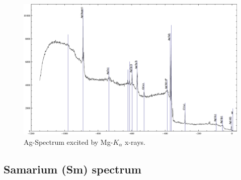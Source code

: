 \documentclass[a4paper]{scrartcl}
\numberwithin{equation}{section}
\numberwithin{figure}{section}
\numberwithin{table}{section}
\begin{document}
\begin{figure}
  \centering
   	\includegraphics[width=\linewidth]{img/agmg.pdf}
 \caption{\small Ag-Spectrum excited by Mg-$K_\alpha$ x-rays.  }
        \label{fig:agmg}
\end{figure}

\clearpage


\subsection{Samarium (Sm) spectrum}
\end{document}
